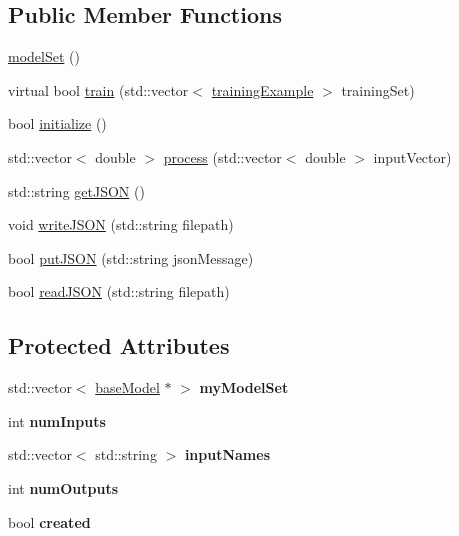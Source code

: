 \subsection*{Public Member Functions}
\begin{DoxyCompactItemize}
\item 
\hyperlink{classmodel_set_ae44cba85f4c52e7d05e0f622b3ea9030}{model\+Set} ()
\item 
virtual bool \hyperlink{classmodel_set_ab0b16ec988c8077158de1c3d8986df03}{train} (std\+::vector$<$ \hyperlink{structtraining_example}{training\+Example} $>$ training\+Set)
\item 
bool \hyperlink{classmodel_set_afefb50a0fe8f45821c6a7599784d7eb4}{initialize} ()
\item 
std\+::vector$<$ double $>$ \hyperlink{classmodel_set_a232b11aa2987dd7db56c0f55edf868ea}{process} (std\+::vector$<$ double $>$ input\+Vector)
\item 
std\+::string \hyperlink{classmodel_set_a031987885b1462ec7d7dbeef0c803d97}{get\+J\+S\+ON} ()
\item 
void \hyperlink{classmodel_set_a805879b6c8ec54d16c2ac511c72442b9}{write\+J\+S\+ON} (std\+::string filepath)
\item 
bool \hyperlink{classmodel_set_a09b07168fbe9d9377eb26f30bf16884c}{put\+J\+S\+ON} (std\+::string json\+Message)
\item 
bool \hyperlink{classmodel_set_a8f7a837515889c6bddb3184a022b1727}{read\+J\+S\+ON} (std\+::string filepath)
\end{DoxyCompactItemize}
\subsection*{Protected Attributes}
\begin{DoxyCompactItemize}
\item 
\mbox{\label{classmodel_set_a390b0b864a8e727f481537b3c37aa721}} 
std\+::vector$<$ \hyperlink{classbase_model}{base\+Model} $\ast$ $>$ {\bfseries my\+Model\+Set}
\item 
\mbox{\label{classmodel_set_ad10fbc1228a85f1200cb89589ad92755}} 
int {\bfseries num\+Inputs}
\item 
\mbox{\label{classmodel_set_ab4b67d7dbdf0659ba6bd18af7247e2ad}} 
std\+::vector$<$ std\+::string $>$ {\bfseries input\+Names}
\item 
\mbox{\label{classmodel_set_addc0df56b9f1970c9816050634933716}} 
int {\bfseries num\+Outputs}
\item 
\mbox{\label{classmodel_set_a0029dc6f8ccfd77353ad38b48198ad7d}} 
bool {\bfseries created}
\end{DoxyCompactItemize}


